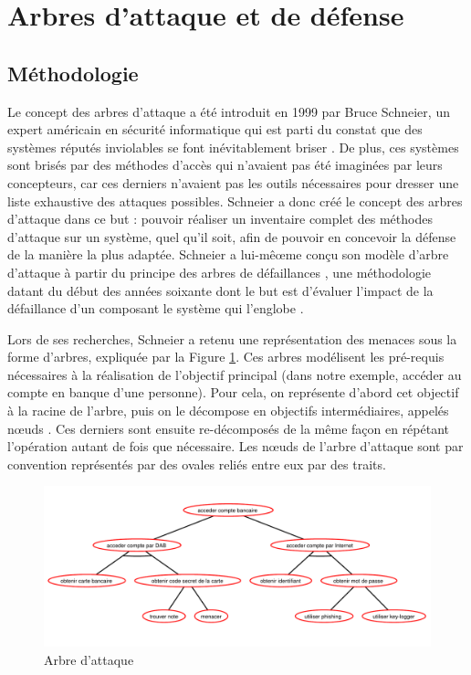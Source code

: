 \section{Arbres d'attaque et de défense}
	\label{sec:etat_art}

    \subsection{Méthodologie}
        Le concept des arbres d'attaque a été introduit en 1999 par Bruce {\sc Schneier}, un expert américain en sécurité informatique qui est parti du constat que des systèmes réputés \og inviolables \fg se font inévitablement briser \cite{doc_Schneier}. De plus, ces systèmes sont brisés par des méthodes d'accès qui n'avaient pas été imaginées par leurs concepteurs, car ces derniers n'avaient pas les outils nécessaires pour dresser une liste exhaustive des attaques possibles. {\sc Schneier} a donc créé le concept des arbres d'attaque dans ce but : pouvoir réaliser un inventaire complet des méthodes d'attaque sur un système, quel qu'il soit, afin de pouvoir en concevoir la défense de la manière la plus adaptée. {\sc Schneier} a lui-mêœme conçu son modèle d'arbre d'attaque à partir du principe des \og arbres de défaillances \fg, une méthodologie datant du début des années soixante dont le but est d'évaluer l'impact de la défaillance d'un composant le système qui l'englobe \cite{defaillanceTree}.

        Lors de ses recherches, {\sc Schneier} a retenu une représentation des menaces sous la forme d'arbres, expliquée par la Figure \ref{fig:arbre_exemple_1}. Ces arbres modélisent les pré-requis nécessaires à la réalisation de l'objectif principal (dans notre exemple, accéder au compte en banque d'une personne). Pour cela, on représente d'abord cet objectif à la racine de l'arbre, puis on le décompose en objectifs intermédiaires, appelés \og nœuds \fg. Ces derniers sont ensuite re-décomposés de la même façon en répétant l'opération autant de fois que nécessaire. Les nœuds de l'arbre d'attaque sont par convention représentés par des ovales reliés entre eux par des traits.

        \begin{figure}[h]
            \centering
            \includegraphics[width=1\textwidth]{figure/exemple1_rapport.pdf}
            \caption{Arbre d'attaque}
            \label{fig:arbre_exemple_1}
        \end{figure}

